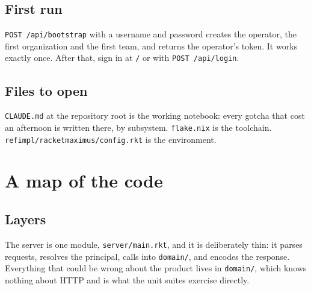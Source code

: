 \documentclass[11pt,a4paper]{report}
\gdef\currentchapterart{art/telemachus-head.png}
\newcommand{\chapterart}[1]{\gdef\currentchapterart{#1}}
\newcommand{\chapterart}[1]{}
\begin{document}
\section{First run}

\texttt{POST /api/bootstrap} with a username and password creates the operator, the first organization and the first team, and returns the operator's token. It works exactly once. After that, sign in at \texttt{/} or with \texttt{POST /api/login}.

\section{Files to open}

\texttt{CLAUDE.md} at the repository root is the working notebook: every gotcha that cost an afternoon is written there, by subsystem. \texttt{flake.nix} is the toolchain. \texttt{refimpl/racketmaximus/config.rkt} is the environment.

\chapterart{art/ch-03-map.png}
\chapter{A map of the code}

\section{Layers}

The server is one module, \texttt{server/main.rkt}, and it is deliberately thin: it parses requests, resolves the principal, calls into \texttt{domain/}, and encodes the response. Everything that could be wrong about the product lives in \texttt{domain/}, which knows nothing about HTTP and is what the unit suites exercise directly.
\end{document}
